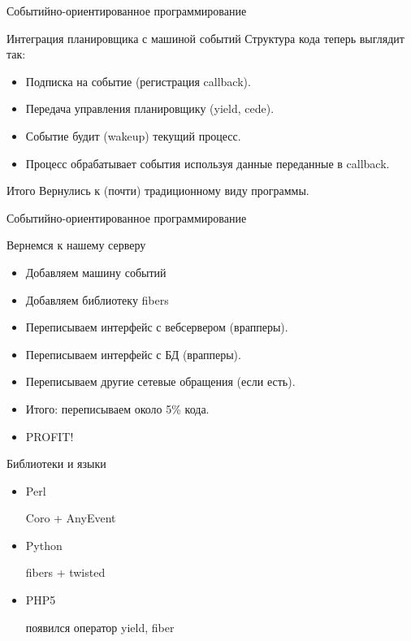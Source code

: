\documentclass[aspectratio=169]{beamer}
\begin{document}
\begin{frame}{Событийно-ориентированное программирование}
    \begin{block}{Интеграция планировщика с машиной событий}
        Структура кода теперь выглядит так:
        \begin{itemize}
            \item Подписка на событие (регистрация callback).
            \item Передача управления планировщику (yield, cede).
            \item Событие будит (wakeup) текущий процесс.
            \item Процесс обрабатывает события используя данные переданные
                в callback.
        \end{itemize}
    \end{block}
    \pause
    \begin{block}{Итого}
        Вернулись к (почти) традиционному виду программы.
    \end{block}
\end{frame}

\begin{frame}{Событийно-ориентированное программирование}
    \begin{block}{Вернемся к нашему серверу}
        \begin{itemize}
            \item Добавляем машину событий
            \item Добавляем библиотеку fibers
            \item Переписываем интерфейс с вебсервером (врапперы).
            \item Переписываем интерфейс с БД (врапперы).
            \item Переписываем другие сетевые обращения (если есть).

            \pause\item Итого: переписываем около 5\% кода.
            \item PROFIT!
        \end{itemize}
    \end{block}
\end{frame}

\begin{frame}{Библиотеки и языки}
    \begin{itemize}
        \item Perl
            \par Coro + AnyEvent
        \item Python
            \par fibers + twisted
        \item PHP5
            \par появился оператор yield, fiber
    \end{itemize}
\end{frame}
\end{document}
